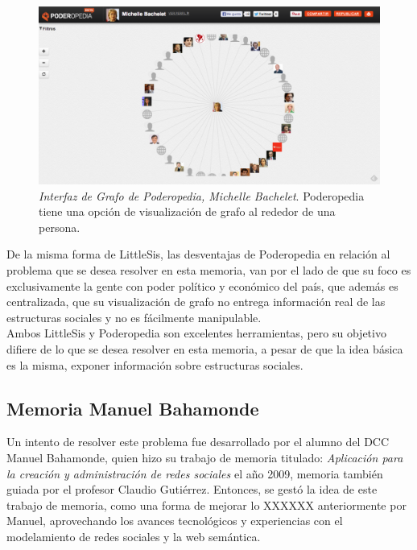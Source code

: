 \begin{figure}[H]
  \includegraphics[width=1.0\textwidth]{images/grafo_poderopedia.png}
  \caption[Interfaz de Grafo de Poderopedia, Michelle Bachelet]{\emph{Interfaz de Grafo de Poderopedia, Michelle Bachelet}. Poderopedia tiene una opción de visualización de grafo al rededor de una persona.}
  \label{ejemplo_grafo_poderopedia}
\end{figure}

De la misma forma de LittleSis, las desventajas de Poderopedia en relación al problema que se desea resolver en esta memoria, van por el lado de que su foco es exclusivamente la gente con poder político y económico del país, que además es centralizada, que su visualización de grafo no entrega información real de las estructuras sociales y no es fácilmente manipulable.\\

Ambos LittleSis y Poderopedia son excelentes herramientas, pero su objetivo difiere de lo que se desea resolver en esta memoria, a pesar de que la idea básica es la misma, exponer información sobre estructuras sociales.


\subsection{Memoria Manuel Bahamonde} %
\label{sub:memoria_manuel_bahamonde}

Un intento de resolver este problema fue desarrollado por el alumno del DCC Manuel Bahamonde, quien hizo su trabajo de memoria titulado: \emph{Aplicación para la creación y administración de redes sociales} \cite{memoriamanuel} el año 2009, memoria también guiada por el profesor Claudio Gutiérrez. Entonces, se gestó la idea de este trabajo de memoria, como una forma de mejorar lo XXXXXX anteriormente por Manuel, aprovechando los avances tecnológicos y experiencias con el modelamiento de redes sociales y la web semántica.\\

